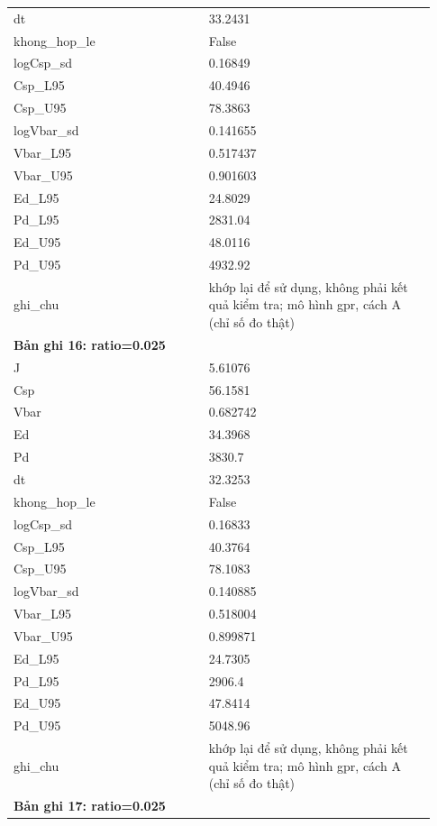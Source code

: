 \begin{longtable}{p{0.43\linewidth}p{0.50\linewidth}}
dt & 33.2431 \\
khong\_\allowbreak hop\_\allowbreak le & False \\
logCsp\_\allowbreak sd & 0.16849 \\
Csp\_\allowbreak L95 & 40.4946 \\
Csp\_\allowbreak U95 & 78.3863 \\
logVbar\_\allowbreak sd & 0.141655 \\
Vbar\_\allowbreak L95 & 0.517437 \\
Vbar\_\allowbreak U95 & 0.901603 \\
Ed\_\allowbreak L95 & 24.8029 \\
Pd\_\allowbreak L95 & 2831.04 \\
Ed\_\allowbreak U95 & 48.0116 \\
Pd\_\allowbreak U95 & 4932.92 \\
ghi\_\allowbreak chu & khớp lại để sử dụng, không phải kết quả kiểm tra; mô hình gpr, cách A (chỉ số đo thật) \\
\midrule
\multicolumn{2}{p{0.95\linewidth}}{\textbf{Bản ghi 16: ratio=0.025}} \\
J & 5.61076 \\
Csp & 56.1581 \\
Vbar & 0.682742 \\
Ed & 34.3968 \\
Pd & 3830.7 \\
dt & 32.3253 \\
khong\_\allowbreak hop\_\allowbreak le & False \\
logCsp\_\allowbreak sd & 0.16833 \\
Csp\_\allowbreak L95 & 40.3764 \\
Csp\_\allowbreak U95 & 78.1083 \\
logVbar\_\allowbreak sd & 0.140885 \\
Vbar\_\allowbreak L95 & 0.518004 \\
Vbar\_\allowbreak U95 & 0.899871 \\
Ed\_\allowbreak L95 & 24.7305 \\
Pd\_\allowbreak L95 & 2906.4 \\
Ed\_\allowbreak U95 & 47.8414 \\
Pd\_\allowbreak U95 & 5048.96 \\
ghi\_\allowbreak chu & khớp lại để sử dụng, không phải kết quả kiểm tra; mô hình gpr, cách A (chỉ số đo thật) \\
\midrule
\multicolumn{2}{p{0.95\linewidth}}{\textbf{Bản ghi 17: ratio=0.025}} \\

\end{longtable}
